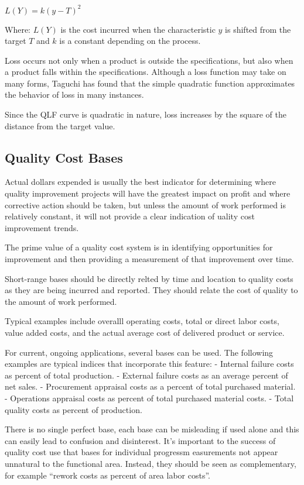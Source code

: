 \documentclass[11pt]{article}
\begin{document}
\(L(Y) = k(y-T)^2\)

Where: \(L(Y)\) is the cost incurred when the characteristic \(y\) is
shifted from the target \(T\) and \(k\) is a constant depending on the
process.

Loss occurs not only when a product is outside the specifications, but
also when a product falls within the specifications. Although a loss
function may take on many forms, Taguchi has found that the simple
quadratic function approximates the behavior of loss in many instances.

Since the QLF curve is quadratic in nature, loss increases by the square
of the distance from the target value.

\hypertarget{quality-cost-bases}{%
\subsection{Quality Cost Bases}\label{quality-cost-bases}}

Actual dollars expended is usually the best indicator for determining
where quality improvement projects will have the greatest impact on
profit and where corrective action should be taken, but unless the
amount of work performed is relatively constant, it will not provide a
clear indication of uality cost improvement trends.

The prime value of a quality cost system is in identifying opportunities
for improvement and then providing a measurement of that improvement
over time.

Short-range bases should be directly relted by time and location to
quality costs as they are being incurred and reported. They should
relate the cost of quality to the amount of work performed.

Typical examples include overalll operating costs, total or direct labor
costs, value added costs, and the actual average cost of delivered
product or service.

For current, ongoing applications, several bases can be used. The
following examples are typical indices that incorporate this feature: -
Internal failure costs as percent of total production. - External
failure costs as an average percent of net sales. - Procurement
appraisal costs as a percent of total purchased material. - Operations
appraisal costs as percent of total purchased material costs. - Total
quality costs as percent of production.

There is no single perfect base, each base can be misleading if used
alone and this can easily lead to confusion and disinterest. It's
important to the success of quality cost use that bases for individual
progressm easurements not appear unnatural to the functional area.
Instead, they should be seen as complementary, for example ``rework
costs as percent of area labor costs''.
\end{document}
